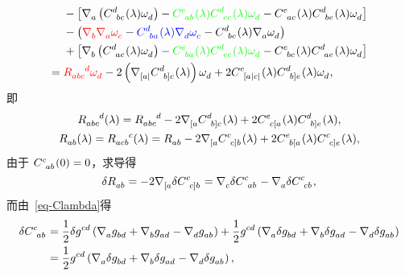 \begin{Proof}
\begin{equation}
\begin{split}
					& {}- \left[ \Nabla{a} \left( \tensor{C}{^d_b_c}(\lambda) \tensor{\omega}{_d} \right) - {\color{green}\tensor{C}{^e_a_b}(\lambda) \tensor{C}{^d_e_c}(\lambda) \tensor{\omega}{_d}} - \tensor{C}{^e_a_c}(\lambda) \tensor{C}{^d_b_e}(\lambda) \tensor{\omega}{_d} \right]\\
					& {}- \left( {\color{red}\Nabla{b} \Nabla{a}\tensor{\omega}{_c}} - {\color{blue}\tensor{C}{^d_b_a}(\lambda) \Nabla{d} \tensor{\omega}{_c}} - \tensor{C}{^d_b_c}(\lambda) \Nabla{a} \tensor{\omega}{_d} \right)\\
					& {} + \left[ \Nabla{b} \left( \tensor{C}{^d_a_c}(\lambda) \tensor{\omega}{_d} \right) - {\color{green}\tensor{C}{^e_b_a}(\lambda) \tensor{C}{^d_e_c}(\lambda) \tensor{\omega}{_d}} - \tensor{C}{^e_b_c}(\lambda) \tensor{C}{^d_a_e}(\lambda) \tensor{\omega}{_d} \right]\\
					={} & {\color{red} \tensor{R}{_a_b_c^d} \tensor{\omega}{_d}} - 2 \left( \Nabla{{[a|}} \tensor{C}{^d_{b]}_c}(\lambda) \right) \tensor{\omega}{_d} + 2 \tensor{C}{^e_{[a}_{|c|}}(\lambda) \tensor{C}{^d_{b]}_e}(\lambda) \tensor{\omega}{_d},
				\end{split}
			\end{equation}
			即
			\begin{gather}
				\tensor{R}{_a_b_c^d}(\lambda) = \tensor{R}{_a_b_c^d} - 2 \Nabla{{[a}} \tensor{C}{^d_{b]}_c}(\lambda) + 2 \tensor{C}{^e_c_{[a}}(\lambda) \tensor{C}{^d_{b]}_e}(\lambda),\\
				\tensor{R}{_a_b}(\lambda) = \tensor{R}{_a_c_b^c}(\lambda) = \tensor{R}{_a_b} - 2 \Nabla{{[a}} \tensor{C}{^c_{c]}_b}(\lambda) + 2 \tensor{C}{^e_b_{[a}}(\lambda) \tensor{C}{^c_{c]}_e}(\lambda),
			\end{gather}
			由于 $\tensor{C}{^c_a_b}(0)=0$，求导得
			\begin{equation}
				\var{\tensor{R}{_a_b}} = - 2 \Nabla{{[a}} \var \tensor{C}{^c_{c]}_b} = \Nabla{c} \var \tensor{C}{^c_a_b} - \Nabla{a} \var \tensor{C}{^c_c_b},\label{eq-varR_varC}
			\end{equation}
			而由~\eqref{eq-Clambda}得
			\begin{equation}
				\begin{split}
					\var{\tensor{C}{^c_a_b}} &= \frac{1}{2} \var\tensor{g}{^c^d} \left( \Nabla{a} \tensor{g}{_b_d} + \Nabla{b} \tensor{g}{_a_d} - \Nabla{d} \tensor{g}{_a_b} \right) + \frac{1}{2} \tensor{g}{^c^d} \left( \Nabla{a} \var \tensor{g}{_b_d} + \Nabla{b} \var \tensor{g}{_a_d} - \Nabla{d} \var \tensor{g}{_a_b} \right)\\
					&= \frac{1}{2} \tensor{g}{^c^d} \left( \Nabla{a} \var \tensor{g}{_b_d} + \Nabla{b} \var \tensor{g}{_a_d} - \Nabla{d} \var \tensor{g}{_a_b} \right),\\

\end{split}
\end{equation}
\end{Proof}
